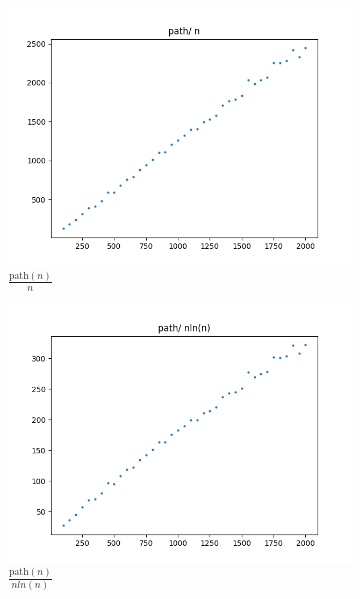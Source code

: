 \documentclass{article}
\begin{document}
\begin{figure}[H]
  \centering
  \begin{subfigure}{.475\textwidth}
    \centering
    \includegraphics[width=\textwidth]{path_n.png}
    \caption{\( \frac{\text{path}(n)}{n} \)}
    \label{fig:path_n}
  \end{subfigure}%
  \begin{subfigure}{.475\textwidth}
    \centering
    \includegraphics[width=\textwidth]{path_nlnn.png}
    \caption{\( \frac{\text{path}(n)}{nln(n)} \)}
    \label{fig:path_nlnn}
  \end{subfigure}%
  \hfill
  \begin{subfigure}{.475\textwidth}
    \centering

\end{subfigure}
\end{figure}
\end{document}

